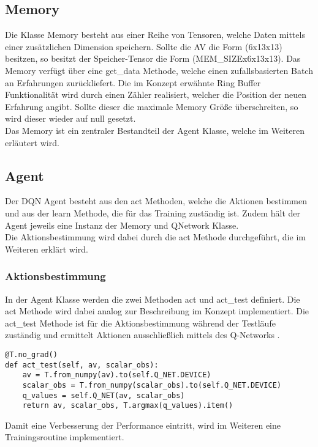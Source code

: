 \subsection{Memory} \label{subsec:Implementierung_Memory_DQN}
Die Klasse Memory besteht aus einer Reihe von Tensoren, welche Daten mittels einer zusätzlichen Dimension speichern.
Sollte die AV die Form (6x13x13) besitzen, so besitzt der Speicher-Tensor die Form (MEM\_SIZEx6x13x13).
Das Memory verfügt über eine get\_data Methode, welche einen zufallsbasierten Batch an Erfahrungen zurückliefert. Die im Konzept erwähnte Ring Buffer Funktionalität  wird durch einen Zähler realisiert, welcher die Position der neuen Erfahrung angibt. Sollte dieser die maximale Memory Größe überschreiten, so wird dieser wieder auf null gesetzt.\\
Das Memory ist ein zentraler Bestandteil der Agent Klasse, welche im Weiteren erläutert wird.

\subsection{Agent} \label{subsec:Implementierung_DQN_Agent}
Der DQN Agent besteht aus den act Methoden, welche die Aktionen bestimmen und aus der learn Methode, die für das Training zuständig ist. Zudem hält der Agent jeweils eine Instanz der Memory und QNetwork Klasse.\\
Die Aktionsbestimmung wird dabei durch die act Methode durchgeführt, die im Weiteren erklärt wird.

\subsubsection{Aktionsbestimmung} \label{subsubsec:Implementierung_Aktionsbestimmung_DQN}
In der Agent Klasse werden die zwei Methoden act und act\_test definiert. Die act Methode wird dabei analog zur Beschreibung im Konzept  implementiert.
Die act\_test Methode ist für die Aktionsbestimmung während der Testläufe zuständig und ermittelt Aktionen ausschließlich mittels des Q-Networks .
\begin{lstlisting}[caption=Aktionsbestimmung, label=code:Aktionsbestimmung, style=Python]
@T.no_grad()
def act_test(self, av, scalar_obs):
	av = T.from_numpy(av).to(self.Q_NET.DEVICE)
	scalar_obs = T.from_numpy(scalar_obs).to(self.Q_NET.DEVICE)
	q_values = self.Q_NET(av, scalar_obs)
	return av, scalar_obs, T.argmax(q_values).item()
\end{lstlisting}
Damit eine Verbesserung der Performance eintritt, wird im Weiteren eine Trainingsroutine implementiert.

